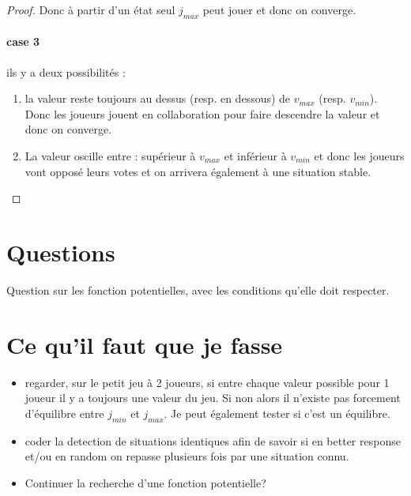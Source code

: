 \documentclass[12pt]{article}
\theoremstyle{defi}
\theoremstyle{not}
\theoremstyle{prob}
\begin{document}
\begin{proof}
        Donc à partir d'un état seul $j_{max}$ peut jouer et donc on converge.


        \paragraph{case 3}
          ils y a deux possibilités :

          \begin{enumerate}
            \item la valeur reste toujours au dessus (resp. en dessous) de $v_{max}$ (resp. $v_{min}$).
              Donc les joueurs jouent en collaboration pour faire descendre la valeur et donc on converge.

            \item La valeur oscille entre : supérieur à $v_{max}$ et inférieur à $v_{min}$ et donc les joueurs vont opposé leurs votes et on arrivera également à une situation stable.
          \end{enumerate}
      \end{proof}

\color{black}
  \section{Questions}
  \color{red}
  Question sur les fonction potentielles, avec les conditions qu'elle doit respecter.
\color{black}
  \section{Ce qu'il faut que je fasse}

    \begin{itemize}
      \color{blue}
      \item regarder, sur le petit jeu à 2 joueurs, si entre chaque valeur possible pour 1 joueur il y a toujours une valeur du jeu. Si non alors il n'existe pas forcement d'équilibre entre $j_{min}$ et $j_{max}$. Je peut également tester si c'est un équilibre.
      \item coder la detection de situations identiques afin de savoir si en better response et/ou en random on repasse plusieurs fois par une situation connu.
      \item Continuer la recherche d'une fonction potentielle?
    \end{itemize}
\end{document}

